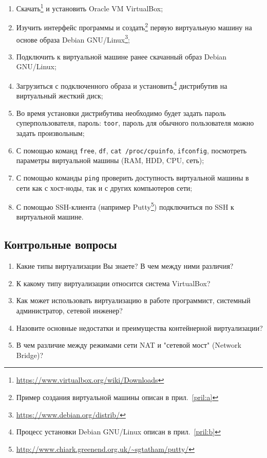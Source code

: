 \begin{enumerate}
    \item Скачать\footnote{\url{https://www.virtualbox.org/wiki/Downloads}} и установить Oracle VM VirtualBox;
    \item Изучить интерфейс программы и создать\footnote{Пример создания виртуальной машины описан в прил.~\ref{pril:a}} первую виртуальную машину на основе образа Debian GNU/Linux\footnote{\url{https://www.debian.org/distrib/}};
    \item Подключить к виртуальной машине ранее скачанный образ Debian GNU/Linux;
    \item Загрузиться с подключенного образа и установить\footnote{Процесс установки Debian GNU/Linux описан в прил.~\ref{pril:b}} дистрибутив на виртуальный жесткий диск;
    \item Во время установки дистрибутива необходимо будет задать пароль суперпользователя, пароль: \texttt{toor}, пароль для обычного пользователя можно задать произвольным;
    \item С помощью команд \texttt{free}, \texttt{df}, \texttt{cat /proc/cpuinfo}, \texttt{ifconfig}, посмотреть параметры виртуальной машины (RAM, HDD, CPU, сеть);
    \item С помощью команды \texttt{ping} проверить доступность виртуальной машины в сети как с хост-ноды, так и с других компьютеров сети;
    \item С помощью SSH-клиента (например Putty\footnote{\url{http://www.chiark.greenend.org.uk/~sgtatham/putty/}}) подключиться по SSH к виртуальной машине.
\end{enumerate}

\subsection{Контрольные вопросы}
\begin{enumerate}
    \item Какие типы виртуализации Вы знаете? В чем между ними различия?
    \item К какому типу виртуализации относится система VirtualBox?
    \item Как может использовать виртуализацию в работе программист, системный администратор, сетевой инженер?
    \item Назовите основные недостатки и преимущества контейнерной виртуализации?
    \item В чем различие между режимами сети NAT и "сетевой мост" (Network Bridge)?
\end{enumerate}

\clearpage
